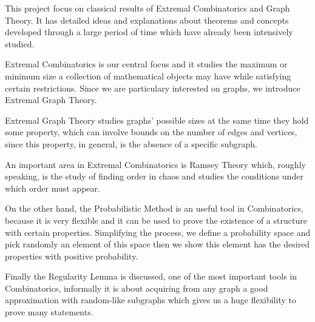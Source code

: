 \documentclass[12pt,twoside,a4paper,bibliography=totocnumbered]{book}
\numberwithin{equation}{section}
\theoremstyle{remark}
\begin{document}
This project focus on classical results of Extremal Combinatorics and Graph Theory. It has detailed ideas and explanations about theorems and concepts developed through a large period of time which have already been intensively studied.

Extremal Combinatorics is our central focus and it studies the maximum or minimum size a collection of mathematical objects may have while satisfying certain restrictions. Since we are particulary interested on graphs, we introduce Extremal Graph Theory. 

Extremal Graph Theory studies graphs' possible sizes at the same time they hold some property, which can involve bounds on the number of edges and vertices, since this property, in general, is the absence of a specific subgraph.

An important area in Extremal Combinatorics is Ramsey Theory which, roughly speaking, is the study of finding order in chaos and studies the conditions under which order must appear.

On the other hand, the Probabilistic Method is an useful tool in Combinatorics, because it is very flexible and it can be used to prove the existence of a structure with certain properties. Simplifying the process, we define a probability space and pick randomly an element of this space then we show this element has the desired properties with positive probability.

Finally the Regularity Lemma is discussed, one of the most important tools in Combinatorics, informally it is about acquiring from any graph a good approximation with random-like subgraphs which gives us a huge flexibility to prove many statements.






\end{document}
